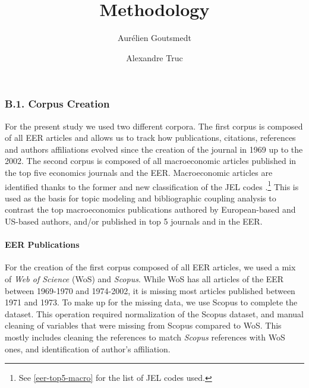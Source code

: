 \documentclass[]{elsarticle} %
\renewenvironment{abstract}{}{}
\begin{document}
\begin{frontmatter}

  \title{Methodology}
    \author[1]{Aurélien Goutsmedt%
  }
  
    \author[2]{Alexandre Truc}
  
  
  \begin{abstract}
  
  \end{abstract}
  
 \end{frontmatter}

\hypertarget{corpus}{%
\subsubsection*{B.1. Corpus Creation}\label{corpus}}

For the present study we used two different corpora. The first corpus is
composed of all EER articles and allows us to track how publications,
citations, references and authors affiliations evolved since the
creation of the journal in 1969 up to the 2002. The second corpus is
composed of all macroeconomic articles published in the top five
economics journals and the EER. Macroeconomic articles are identified
thanks to the former and new classification of the JEL codes
\citep{jel1991}.\footnote{See \ref{eer-top5-macro} for the list of JEL
  codes used.} This is used as the basis for topic modeling and
bibliographic coupling analysis to contrast the top macroeconomics
publications authored by European-based and US-based authors, and/or
published in top 5 journals and in the EER.

\hypertarget{eer-publications}{%
\paragraph*{EER Publications}\label{eer-publications}}

For the creation of the first corpus composed of all EER articles, we
used a mix of \emph{Web of Science} (WoS) and \emph{Scopus}. While WoS
has all articles of the EER between 1969-1970 and 1974-2002, it is
missing most articles published between 1971 and 1973. To make up for
the missing data, we use Scopus to complete the dataset. This operation
required normalization of the Scopus dataset, and manual cleaning of
variables that were missing from Scopus compared to WoS. This mostly
includes cleaning the references to match \emph{Scopus} references with
WoS ones, and identification of author's affiliation.
\end{document}
